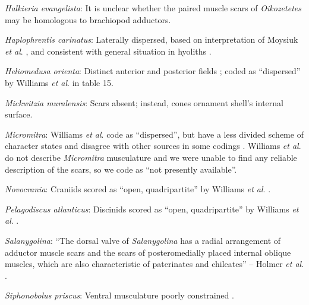 \documentclass[openany]{book}
\theoremstyle{definition}
\theoremstyle{definition}
\theoremstyle{definition}
\theoremstyle{remark}
\begin{document}
\hypertarget{Halkieria_evangelista-coding-79}{}
\emph{Halkieria evangelista}: It is unclear whether the paired muscle
scars of \emph{Oikozetetes} may be homologous to brachiopod adductors.

\hypertarget{Haplophrentis_carinatus-coding-79}{}
\emph{Haplophrentis carinatus}: Laterally dispersed, based on
interpretation of Moysiuk \emph{et al}.
\citeyearpar{Moysiuk2017Hyolithsare}, and consistent with general
situation in hyoliths \citep[see][]{Dzik1980Ontogenyof}.

\hypertarget{Heliomedusa_orienta-coding-79}{}
\emph{Heliomedusa orienta}: Distinct anterior and posterior fields
\citep{Chen2007Reinterpretationof}; coded as ``dispersed'' by Williams
\emph{et al}. \citeyearpar{Williams2000LinguliformeaCraniiformea} in
table 15.

\hypertarget{Mickwitzia_muralensis-coding-79}{}
\emph{Mickwitzia muralensis}: Scars absent; instead, cones ornament
shell's internal surface.

\hypertarget{Micromitra-coding-79}{}
\emph{Micromitra}: Williams \emph{et al}.
\citeyearpar{Williams1998Thediversity} code as ``dispersed'', but have a
less divided scheme of character states and disagree with other sources
in some codings \citep[e.g.][in
Kutorginates]{Bassett2001Functionalmorphology}. Williams \emph{et al}.
\citeyearpar{Williams2000LinguliformeaCraniiformea} do not describe
\emph{Micromitra} musculature and we were unable to find any reliable
description of the scars, so we code as ``not presently available''.

\hypertarget{Novocrania-coding-79}{}
\emph{Novocrania}: Craniids scored as ``open, quadripartite'' by
Williams \emph{et al}. \citeyearpar{Williams1996Asupra}.

\hypertarget{Pelagodiscus_atlanticus-coding-79}{}
\emph{Pelagodiscus atlanticus}: Discinids scored as ``open,
quadripartite'' by Williams \emph{et al}.
\citeyearpar{Williams1996Asupra}.

\hypertarget{Salanygolina-coding-79}{}
\emph{Salanygolina}: ``The dorsal valve of \emph{Salanygolina} has a
radial arrangement of adductor muscle scars and the scars of
posteromedially placed internal oblique muscles, which are also
characteristic of paterinates and chileates'' -- Holmer \emph{et al}.
\citeyearpar{Holmer2009Theenigmatic}.

\hypertarget{Siphonobolus_priscus-coding-79}{}
\emph{Siphonobolus priscus}: Ventral musculature poorly constrained
\citep{Williams2000LinguliformeaCraniiformea, Popov2009Earlyontogeny}.
\end{document}
